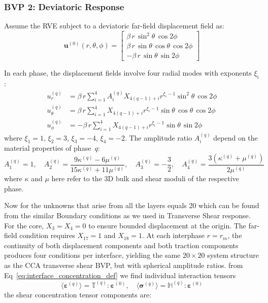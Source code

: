 \documentclass[oneside, 12pt, a4paper, bibliography=totoc]{book}
\newcommand{\bs}[1]{\bm{#1}}                       %
\begin{document}
\subsubsection{BVP 2: Deviatoric Response}

Assume the RVE subject to a deviatoric far-field displacement field as:
%
\begin{equation}
    \bs{u}^{(0)}(r, \theta, \phi) =
    \begin{bmatrix}
        \beta \, r \, \sin^2\!\theta \, \cos 2\phi \\
        \beta \, r \, \sin\theta \, \cos\theta \, \cos 2\phi \\
        -\beta \, r \, \sin\theta \, \sin 2\phi
    \end{bmatrix}
    \label{eq:bvp2_sph_farfield}
\end{equation}
%

In each phase, the displacement fields involve four radial modes with exponents $\xi_i$:
%
\begin{align}
    u_r^{(q)} &= \beta \, r \sum_{i=1}^{4} A_i^{(q)} X_{4(q-1)+i} r^{\xi_i-1} \sin^2\!\theta \, \cos 2\phi \label{eq:ur_deviatoric}\\
    u_\theta^{(q)} &= \beta \, r \sum_{i=1}^{4}  X_{4(q-1)+i} r^{\xi_i-1} \sin\theta \, \cos\theta \, \cos 2\phi \label{eq:utheta_deviatoric}\\
    u_\phi^{(q)} &= -\beta \, r \sum_{i=1}^{4}  X_{4(q-1)+i} r^{\xi_i-1} \sin\theta \,  \sin 2\phi \label{eq:uphi_deviatoric}
\end{align}
%
where $\xi_1 = 1$, $\xi_2 = 3$, $\xi_3 = -4$, $\xi_4 = -2$. The amplitude ratio $A_i^{(q)}$ depend on the material properties of phase~$q$:
%
\begin{equation}
    A_1^{(q)} = 1, \quad A_2^{(q)} = \frac{9\kappa^{(q)} - 6\mu^{(q)}}{15\kappa^{(q)} + 11\mu^{(q)}}, \quad A_3^{(q)} = -\frac{3}{2}, \quad A_4^{(q)} = \frac{3(\kappa^{(q)} + \mu^{(q)})}{2\mu^{(q)}}
    \label{eq:a_coefficients}
\end{equation}
%
where $\kappa$ and $\mu$ here refer to the 3D bulk and shear moduli of the respective phase.

Now for the unknowns that arise from all the layers equals 20 which can be found from the similar Boundary conditions as we used in Transverse Shear response.
For the core, $X_3 = X_4 = 0$ to ensure bounded displacement at the origin. The far-field condition requires $X_{17} = 1$ and $X_{18} = 1$. At each interphase $r = r_m$, the continuity of both displacement components and both traction components produces four conditions per interface, yielding the same $20 \times 20$ system structure as the CCA transverse shear BVP, but with spherical amplitude ratios.
%
from Eq~\ref{eq:interface_concentration_def} we find individual interaction tensors 
\begin{equation}
    \langle \bs{\varepsilon}^{(q)} \rangle = \mathbb{T}^{(q)} : \bs{\varepsilon}^{(0)}, \quad
    \langle \bs{\sigma}^{(q)} \rangle = \mathbb{H}^{(q)} : \bs{\varepsilon}^{(0)}
\end{equation}
the shear concentration tensor components are:
\end{document}

